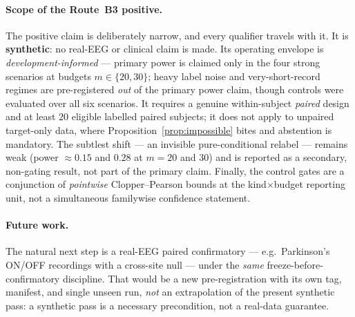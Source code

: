 \paragraph{Scope of the Route~B3 positive.}
The positive claim is deliberately narrow, and every qualifier travels with it. It is \textbf{synthetic}: no
real-EEG or clinical claim is made.  Its operating envelope is
\emph{development-informed} --- primary power is claimed only in the four strong scenarios at budgets
$m\in\{20,30\}$; heavy label noise and very-short-record regimes are pre-registered \emph{out} of the primary
power claim, though controls were evaluated over all six scenarios.  It requires a
genuine within-subject \emph{paired} design and at least $20$ eligible labelled paired subjects; it does not
apply to unpaired target-only data, where Proposition~\ref{prop:impossible} bites and abstention is mandatory.
 The subtlest shift --- an invisible pure-conditional relabel --- remains weak
(power $\approx 0.15$ and $0.28$ at $m{=}20$ and $30$) and is reported as a secondary, non-gating result, not
part of the primary claim.  Finally, the control gates are a conjunction of
\emph{pointwise} Clopper--Pearson bounds at the kind$\times$budget reporting unit, not a simultaneous
familywise confidence statement. 

\paragraph{Future work.}
The natural next step is a real-EEG paired confirmatory --- e.g.\ Parkinson's ON/OFF recordings with a
cross-site null --- under the \emph{same} freeze-before-confirmatory discipline. That would be a new
pre-registration with its own tag, manifest, and single unseen run, \emph{not} an extrapolation of the present
synthetic pass: a synthetic pass is a necessary precondition, not a real-data guarantee.
